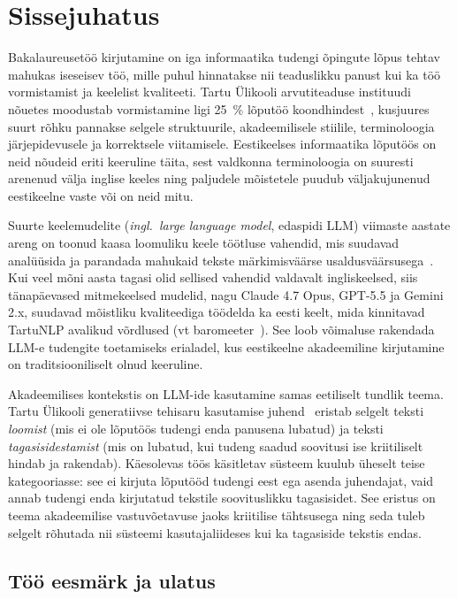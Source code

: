 \section{Sissejuhatus} \label{sissejuhatus}

Bakalaureusetöö kirjutamine on iga informaatika tudengi õpingute lõpus tehtav mahukas iseseisev töö, mille puhul hinnatakse nii teaduslikku panust kui ka töö vormistamist ja keelelist kvaliteeti. Tartu Ülikooli arvutiteaduse instituudi nõuetes moodustab vormistamine ligi 25~\% lõputöö koondhindest~\cite{ut_juhend_2024}, kusjuures suurt rõhku pannakse selgele struktuurile, akadeemilisele stiilile, terminoloogia järjepidevusele ja korrektsele viitamisele. Eestikeelses informaatika lõputöös on neid nõudeid eriti keeruline täita, sest valdkonna terminoloogia on suuresti arenenud välja inglise keeles ning paljudele mõistetele puudub väljakujunenud eestikeelne vaste või on neid mitu.

Suurte keelemudelite (\emph{ingl.\ large language model}, edaspidi LLM) viimaste aastate areng on toonud kaasa loomuliku keele töötluse vahendid, mis suudavad analüüsida ja parandada mahukaid tekste märkimisväärse usaldusväärsusega~\cite{brown_language_2020, openai_gpt4_2023, anthropic_claude_2024}. Kui veel mõni aasta tagasi olid sellised vahendid valdavalt ingliskeelsed, siis tänapäevased mitmekeelsed mudelid, nagu Claude 4.7 Opus, GPT-5.5 ja Gemini 2.x, suudavad mõistliku kvaliteediga töödelda ka eesti keelt, mida kinnitavad TartuNLP avalikud võrdlused (vt baromeeter~\cite{tartunlp_baromeeter_2025}). See loob võimaluse rakendada LLM-e tudengite toetamiseks erialadel, kus eestikeelne akadeemiline kirjutamine on traditsiooniliselt olnud keeruline.

Akadeemilises kontekstis on LLM-ide kasutamine samas eetiliselt tundlik teema. Tartu Ülikooli generatiivse tehisaru kasutamise juhend~\cite{ut_genAI_2024} eristab selgelt teksti \emph{loomist} (mis ei ole lõputöös tudengi enda panusena lubatud) ja teksti \emph{tagasisidestamist} (mis on lubatud, kui tudeng saadud soovitusi ise kriitiliselt hindab ja rakendab). Käesolevas töös käsitletav süsteem kuulub üheselt teise kategooriasse: see ei kirjuta lõputööd tudengi eest ega asenda juhendajat, vaid annab tudengi enda kirjutatud tekstile soovituslikku tagasisidet. See eristus on teema akadeemilise vastuvõetavuse jaoks kriitilise tähtsusega ning seda tuleb selgelt rõhutada nii süsteemi kasutajaliideses kui ka tagasiside tekstis endas.

\subsection*{Töö eesmärk ja ulatus}

